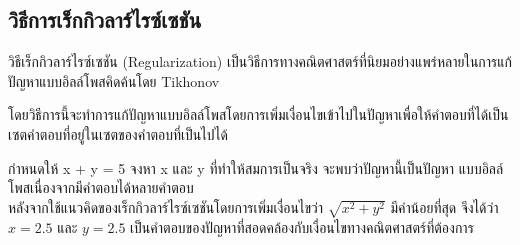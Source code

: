 \subsection{วิธีการเร็กกิวลาร์ไรซ์เซชัน}
\hspace{1cm} วิธีเร็กกิวลาร์ไรซ์เซชัน (Regularization) เป็นวิธีการทางคณิตศาสตร์ที่นิยมอย่างแพร่หลายในการแก้ปัญหาแบบอิลล์โพสคิดค้นโดย Tikhonov \cite{ref:regularization} 

\hspace{1cm} โดยวิธีการนี้จะทำการแก้ปัญหาแบบอิลล์โพสโดยการเพิ่มเงื่อนไขเข้าไปในปัญหาเพื่อให้คำตอบที่ได้เป็นเซตคำตอบที่อยู่ในเซตของคำตอบที่เป็นไปได้ 

\begin{Example}
    กำหนดให้ x + y = 5 จงหา x และ y ที่ทำให้สมการเป็นจริง
    จะพบว่าปัญหานี้เป็นปัญหา \break แบบอิลล์โพสเนื่องจากมีคำตอบได้หลายคำตอบ \\
    \hspace*{1cm} หลังจากใช้แนวคิดของเร็กกิวลาร์ไรซ์เซชันโดยการเพิ่มเงื่อนไขว่า $\sqrt{x^2+y^2}$ มีค่าน้อยที่สุด
    จึงได้ว่า  $x = 2.5$ และ $y = 2.5$ เป็นคำตอบของปัญหาที่สอดคล้องกับเงื่อนไขทางคณิตศาสตร์ที่ต้องการ
\end{Example}